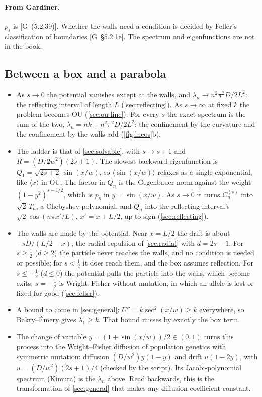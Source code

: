 \documentclass[11pt]{article}
\numberwithin{equation}{section}
\newcommand{\avg}[1]{\langle #1\rangle}
\newcommand{\G}[1]{[G~(#1)]}
\newcommand{\Gs}[1]{[G~\S#1]}
\begin{document}
\paragraph{From Gardiner.} $p_s$ is \G{5.2.39}. Whether the walls need a condition is decided by Feller's
classification of boundaries \Gs{5.2.1e}. The spectrum and eigenfunctions are not in the book.

\subsection{Between a box and a parabola}

\begin{itemize}
  \item As $s\to0$ the potential vanishes except at the walls, and $\lambda_n\to n^2\pi^2D/2L^2$: the reflecting
        interval of length $L$ (\cref{sec:reflecting}). As $s\to\infty$ at fixed $k$ the problem becomes OU
        (\cref{sec:ou-line}). For every $s$ the exact spectrum is the sum of the two,
        $\lambda_n=nk+n^2\pi^2D/2L^2$: the confinement by the curvature and the confinement by the walls add
        (\cref{fig:lncos}b).
  \item The ladder is that of \cref{sec:solvable}, with $s\to s+1$ and $R=(D/2w^2)(2s+1)$. The slowest backward
        eigenfunction is $Q_1=\sqrt{2s+2}\,\sin(x/w)$, so $\avg{\sin(x/w)}$ relaxes as a single exponential, like
        $\avg x$ in OU. The factor in $Q_n$ is the Gegenbauer norm against the weight $(1-y^2)^{s-1/2}$, which is
        $p_s$ in $y=\sin(x/w)$. As $s\to0$ it turns $C_n^{(s)}$ into $\sqrt2\,T_n$, a Chebyshev polynomial, and
        $Q_n$ into the reflecting interval's $\sqrt2\cos(n\pi x'/L)$, $x'=x+L/2$, up to sign (\cref{sec:reflecting}).
  \item The walls are made by the potential. Near $x=L/2$ the drift is about $-sD/(L/2-x)$, the radial repulsion
        of \cref{sec:radial} with $d=2s+1$. For $s\ge\frac12$ ($d\ge2$) the particle never reaches the walls, and
        no condition is needed or possible; for $s<\frac12$ it does reach them, and the box assumes reflection. For
        $s\le-\frac12$ ($d\le0$) the potential pulls the particle into the walls, which become exits; $s=-\frac12$ is
        Wright--Fisher without mutation, in which an allele is lost or fixed for good (\cref{sec:feller}).
  \item A bound to come in \cref{sec:general}: $U''=k\sec^2(x/w)\ge k$ everywhere, so Bakry--\'Emery gives
        $\lambda_1\ge k$. That bound misses by exactly the box term.
  \item The change of variable $y=(1+\sin(x/w))/2\in(0,1)$ turns this process into the Wright--Fisher diffusion of
        population genetics with symmetric mutation: diffusion $(D/w^2)y(1-y)$ and drift $u(1-2y)$, with
        $u=(D/w^2)(2s+1)/4$ (checked by the script). Its Jacobi-polynomial spectrum (Kimura) is the $\lambda_n$
        above. Read backwards, this is the transformation of \cref{sec:general} that makes any diffusion
        coefficient constant.
\end{itemize}
\end{document}
